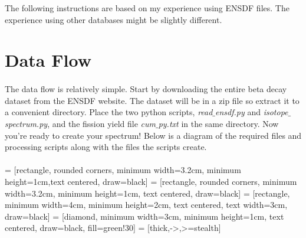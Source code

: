 \documentclass{report}
\begin{document}
 The following instructions are based on my experience using ENSDF files. The experience using other databases might be slightly different.
 \section{Data Flow}
 \paragraph{}
 The data flow is relatively simple. Start by downloading the entire beta decay dataset from the 
 ENSDF website. The dataset will be in a zip file so extract it to a convenient directory. Place the 
 two python scripts, \textit{read$\_$ensdf.py} and \textit{isotope$\_$spectrum.py}, and the fission yield
 file \textit{cum$\_$py.txt} in the same directory. 
 Now you're ready to create your spectrum! Below is a diagram of the required files and processing 
 scripts along with the files the scripts create.
 \\ \\ 
  = [rectangle, rounded corners, minimum width=3.2cm, minimum height=1cm,text centered, draw=black]
 = [rectangle, rounded corners, minimum width=3.2cm, minimum height=1cm, text centered, draw=black]%
 = [rectangle, minimum width=4cm, minimum height=2cm, text centered, text width=3cm, draw=black]%
 = [diamond, minimum width=3cm, minimum height=1cm, text centered, draw=black, fill=green!30]
 = [thick,->,>=stealth]

\\ \\ \\
\end{document}

